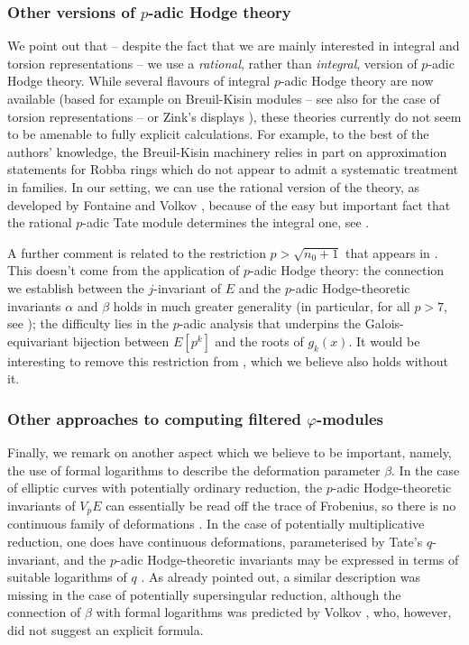 \documentclass{amsart}
\theoremstyle{definition}
\numberwithin{theorem}{section}
\numberwithin{equation}{section}
\begin{document}
\subsubsection*{Other versions of $p$-adic Hodge theory}
We point out that -- despite the fact that we are mainly interested in integral and torsion representations -- we use a \textit{rational}, rather than \textit{integral}, version of $p$-adic Hodge theory. While several flavours of integral $p$-adic Hodge theory are now available (based for example on Breuil-Kisin modules \cite{MR1971512, MR2263197} -- see also \cite{MR2191528} for the case of torsion representations -- or Zink's displays \cite{MR1922825}), these theories currently do not seem to be amenable to fully explicit calculations. For example, to the best of the authors' knowledge, the Breuil-Kisin machinery relies in part on approximation statements for Robba rings which do not appear to admit a systematic treatment in families. In our setting, we can use the rational version of the theory, as developed by Fontaine \cite{Fontaine-p-divisible, Fontaine82, MR1293972} and Volkov \cite{Volkov}, because of the easy but important fact that the rational $p$-adic Tate module determines the integral one, see .

A further comment is related to the restriction $p>\sqrt{n_0+1}$ that appears in . This doesn't come from the application of $p$-adic Hodge theory: the connection we establish between the $j$-invariant of $E$ and the $p$-adic Hodge-theoretic invariants $\alpha$ and $\beta$ holds in much greater generality (in particular, for all $p>7$, see ); the difficulty lies in the $p$-adic analysis that underpins the Galois-equivariant bijection between $E[p^k]$ and the roots of $g_k(x)$. It would be interesting to remove this restriction from , which we believe also holds without it.

\subsubsection*{Other approaches to computing filtered $\varphi$-modules}
Finally, we remark on another aspect which we believe to be important, namely, the use of formal logarithms to describe the deformation parameter $\beta$. In the case of elliptic curves with potentially ordinary reduction, the $p$-adic Hodge-theoretic invariants of $V_pE$ can essentially be read off the trace of Frobenius, so there is no continuous family of deformations \cite[p.~111]{Volkov}.
In the case of potentially multiplicative reduction, one does have continuous deformations, parameterised by Tate's $q$-invariant, and the $p$-adic Hodge-theoretic invariants may be expressed in terms of suitable logarithms of $q$ \cite[p.~107]{Volkov}. As already pointed out, a similar description was missing in the case of potentially supersingular reduction, although the connection of $\beta$ with formal logarithms was predicted by Volkov \cite[Remarque on p.~133]{Volkov}, who, however, did not suggest an explicit formula.
\end{document}
